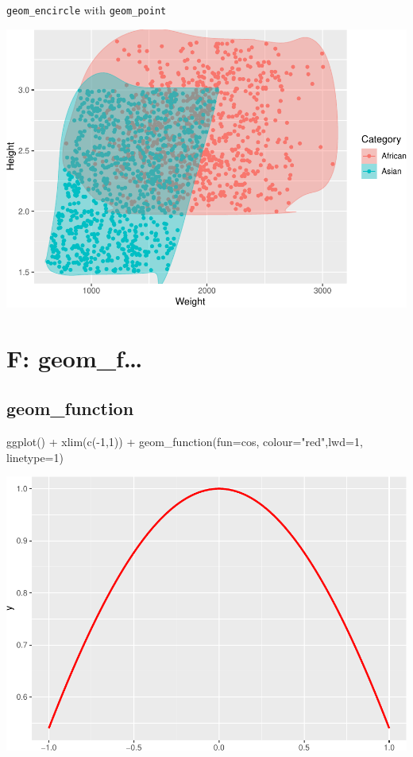 \documentclass[
]{book}
\newenvironment{Shaded}{\begin{snugshade}}{\end{snugshade}}
\newcommand{\AttributeTok}[1]{\textcolor[rgb]{0.77,0.63,0.00}{#1}}
\newcommand{\DecValTok}[1]{\textcolor[rgb]{0.00,0.00,0.81}{#1}}
\newcommand{\FunctionTok}[1]{\textcolor[rgb]{0.00,0.00,0.00}{#1}}
\newcommand{\NormalTok}[1]{#1}
\newcommand{\SpecialCharTok}[1]{\textcolor[rgb]{0.00,0.00,0.00}{#1}}
\newcommand{\StringTok}[1]{\textcolor[rgb]{0.31,0.60,0.02}{#1}}
\begin{document}
\texttt{geom\_encircle} with \texttt{geom\_point}

\includegraphics{Data-Visualisation-geom-Encyclopedia_files/figure-latex/unnamed-chunk-37-1.pdf}

\hypertarget{f-geom_f}{%
\chapter{F: geom\_f\ldots{}}\label{f-geom_f}}

\hypertarget{geom_function}{%
\section{geom\_function}\label{geom_function}}

\begin{Shaded}
\begin{Highlighting}[]
\FunctionTok{ggplot}\NormalTok{() }\SpecialCharTok{+} \FunctionTok{xlim}\NormalTok{(}\FunctionTok{c}\NormalTok{(}\SpecialCharTok{{-}}\DecValTok{1}\NormalTok{,}\DecValTok{1}\NormalTok{)) }\SpecialCharTok{+} \FunctionTok{geom\_function}\NormalTok{(}\AttributeTok{fun=}\NormalTok{cos, }\AttributeTok{colour=}\StringTok{"red"}\NormalTok{,}\AttributeTok{lwd=}\DecValTok{1}\NormalTok{, }\AttributeTok{linetype=}\DecValTok{1}\NormalTok{)}
\end{Highlighting}
\end{Shaded}

\includegraphics{Data-Visualisation-geom-Encyclopedia_files/figure-latex/unnamed-chunk-38-1.pdf}
\end{document}
